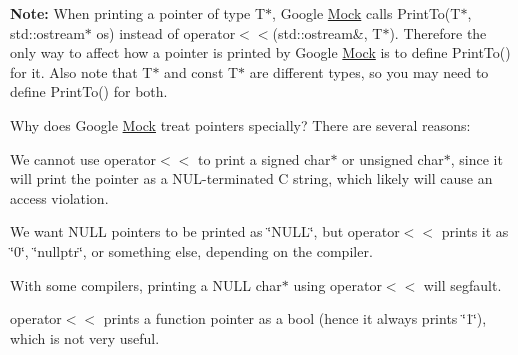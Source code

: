 {\bfseries{Note\+:}} When printing a pointer of type {\ttfamily T$\ast$}, Google \mbox{\hyperlink{class_mock}{Mock}} calls {\ttfamily Print\+To(\+T$\ast$, std\+::ostream$\ast$ os)} instead of {\ttfamily operator$<$$<$(std\+::ostream\&, T$\ast$)}. Therefore the only way to affect how a pointer is printed by Google \mbox{\hyperlink{class_mock}{Mock}} is to define {\ttfamily Print\+To()} for it. Also note that {\ttfamily T$\ast$} and {\ttfamily const T$\ast$} are different types, so you may need to define {\ttfamily Print\+To()} for both.

Why does Google \mbox{\hyperlink{class_mock}{Mock}} treat pointers specially? There are several reasons\+:


\begin{DoxyItemize}
\item We cannot use {\ttfamily operator$<$$<$} to print a {\ttfamily signed char$\ast$} or {\ttfamily unsigned char$\ast$}, since it will print the pointer as a N\+U\+L-\/terminated C string, which likely will cause an access violation.
\item We want {\ttfamily N\+U\+LL} pointers to be printed as {\ttfamily \char`\"{}\+N\+U\+L\+L\char`\"{}}, but {\ttfamily operator$<$$<$} prints it as {\ttfamily \char`\"{}0\char`\"{}}, {\ttfamily \char`\"{}nullptr\char`\"{}}, or something else, depending on the compiler.
\item With some compilers, printing a {\ttfamily N\+U\+LL} {\ttfamily char$\ast$} using {\ttfamily operator$<$$<$} will segfault.
\item {\ttfamily operator$<$$<$} prints a function pointer as a {\ttfamily bool} (hence it always prints {\ttfamily \char`\"{}1\char`\"{}}), which is not very useful. 
\end{DoxyItemize}